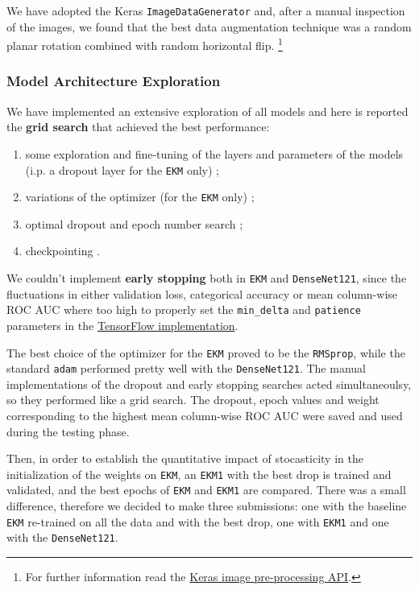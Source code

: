 \documentclass[10pt,]{article}
\providecommand{\tightlist}{%
  \setlength{\itemsep}{0pt}\setlength{\parskip}{0pt}}
\begin{document}
We have adopted the Keras \texttt{ImageDataGenerator} and, after a
manual inspection of the images, we found that the best data
augmentation technique was a random planar rotation combined with random
horizontal flip. \footnote{For further information read the
  \href{https://keras.io/api/preprocessing/image/}{Keras image
  pre-processing API}.}

\hypertarget{exploration}{%
\subsubsection{Model Architecture Exploration}\label{exploration}}

We have implemented an extensive exploration of all models and here is
reported the \textbf{grid search} that achieved the best performance:

\begin{enumerate}
\def\labelenumi{\arabic{enumi}.}
\tightlist
\item
  some exploration and fine-tuning of the layers and parameters of the
  models (i.p. a dropout layer for the \texttt{EKM} only) ;
\item
  variations of the optimizer (for the \texttt{EKM} only) ;
\item
  optimal dropout and epoch number search ;
\item
  checkpointing .
\end{enumerate}

We couldn't implement \textbf{early stopping} both in \texttt{EKM} and
\texttt{DenseNet121}, since the fluctuations in either validation loss,
categorical accuracy or mean column-wise ROC AUC where too high to
properly set the \texttt{min\_delta} and \texttt{patience} parameters in
the
\href{https://www.tensorflow.org/api_docs/python/tf/keras/callbacks/EarlyStopping}{TensorFlow
implementation}.

The best choice of the optimizer for the \texttt{EKM} proved to be the
\texttt{RMSprop}, while the standard \texttt{adam} performed pretty well
with the \texttt{DenseNet121}. The manual implementations of the dropout
and early stopping searches acted simultaneoulsy, so they performed like
a grid search. The dropout, epoch values and weight corresponding to the
highest mean column-wise ROC AUC were saved and used during the testing
phase.

Then, in order to establish the quantitative impact of stocasticity in
the initialization of the weights on \texttt{EKM}, an \texttt{EKM1} with
the best drop is trained and validated, and the best epochs of
\texttt{EKM} and \texttt{EKM1} are compared. There was a small
difference, therefore we decided to make three submissions: one with the
baseline \texttt{EKM} re-trained on all the data and with the best drop,
one with \texttt{EKM1} and one with the \texttt{DenseNet121}.
\end{document}
